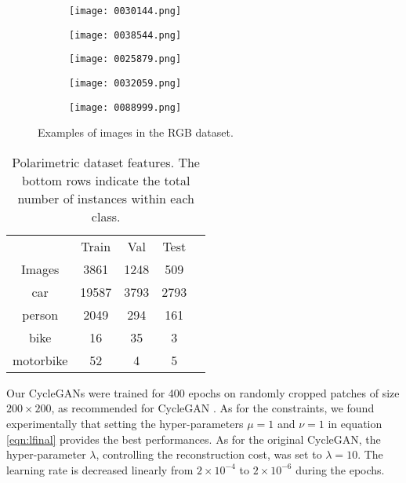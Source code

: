 \begin{figure}
	\centering
	\begin{subfigure}{.2\textwidth}
		\centering
		\texttt{[image: 0030144.png]}
	\end{subfigure}%
	\begin{subfigure}{.2\textwidth}
		\centering
		\texttt{[image: 0038544.png]}
	\end{subfigure}%
	\begin{subfigure}{.2\textwidth}
		\centering
		\texttt{[image: 0025879.png]}
	\end{subfigure}%
	\begin{subfigure}{.2\textwidth}
		\centering
		\texttt{[image: 0032059.png]}
	\end{subfigure}%
	\begin{subfigure}{.2\textwidth}
		\centering
		\texttt{[image: 0088999.png]}
	\end{subfigure}
	\caption{Examples of images in the RGB dataset.}
	\label{fig:rgb_example}
\end{figure}

\begin{table}
	\begin{center}
		\begin{tabular}{c c c c c}
			\Bigrule
			& Train & Val & Test \\
			\bigrule
			Images & 3861 & 1248 & 509 \\
			\bigrule
			car & 19587 & 3793 & 2793 \\
			person & 2049 & 294 & 161 \\
			bike & 16 & 35 & 3 \\
			motorbike & 52 & 4 & 5 \\
		\end{tabular}
		\caption[Polarimetric dataset features]{Polarimetric dataset features. The bottom rows indicate the total number of instances within each class.}
		\label{tab:dataset_properties}
	\end{center}
\end{table}

Our \ac{CycleGAN}s were trained for 400 epochs on randomly cropped patches of size $200\times 200$, as recommended for CycleGAN \citep{Zhu2017a}. As for the constraints, we found experimentally that setting the hyper-parameters $\mu = 1$ and $\nu = 1$ in equation \eqref{eqn:lfinal} provides the best performances. As for the original CycleGAN, the hyper-parameter $\lambda$, controlling the reconstruction cost,
was set to $\lambda = 10$. The learning rate is decreased linearly from $2 \times 10^{-4}$ to $2 \times 10^{-6}$ during the epochs.

